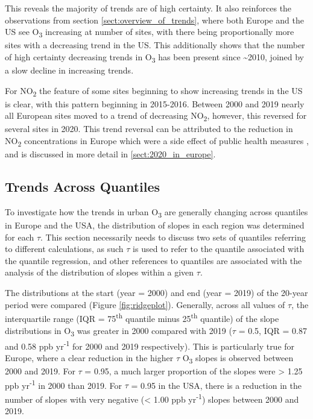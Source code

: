 \documentclass[journal abbreviation, manuscript]{copernicus}
\begin{document}
This reveals the majority of trends are of high certainty. It also reinforces the observations from section \ref{sect:overview_of_trends}, where both Europe and the US see O\textsubscript{3} increasing at number of sites, with there being proportionally more sites with a decreasing trend in the US. This additionally shows that the number of high certainty decreasing trends in O\textsubscript{3} has been present since \textasciitilde{2010}, joined by a slow decline in increasing trends. 

For NO\textsubscript{2} the feature of some sites beginning to show increasing trends in the US is clear, with this pattern beginning in 2015-2016. Between 2000 and 2019 nearly all European sites moved to a trend of decreasing NO\textsubscript{2}, however, this reversed for several sites in 2020. This trend reversal can be attributed to the reduction in NO\textsubscript{2} concentrations in Europe which were a side effect of public health measures \citep{acp-20-15743-2020, acp-21-4169-2021}, and is discussed in more detail in \ref{sect:2020_in_europe}.  


\subsection{Trends Across Quantiles} \label{sect:trends_across_quantiles}

To investigate how the trends in urban O\textsubscript{3} are generally changing across quantiles in Europe and the USA, the distribution of slopes in each region was determined for each $\tau$. This section necessarily needs to discuss two sets of quantiles referring to different calculations, as such $\tau$ is used to refer to the quantile associated with the quantile regression, and other references to quantiles are associated with the analysis of the distribution of slopes within a given $\tau$.

The distributions at the start (year = 2000) and end (year = 2019) of the 20-year period were compared (Figure \ref{fig:ridgeplot}). Generally, across all values of $\tau$, the interquartile range (IQR = 75\textsuperscript{th} quantile minus 25\textsuperscript{th} quantile) of the slope distributions in O\textsubscript{3} was greater in 2000 compared with 2019 ($\tau$ = 0.5, IQR = 0.87 and 0.58 ppb yr\textsuperscript{-1} for 2000 and 2019 respectively). This is particularly true for Europe, where a clear reduction in the higher $\tau$ O\textsubscript{3} slopes is observed between 2000 and 2019. For $\tau$ = 0.95, a much larger proportion of the slopes were > 1.25 ppb yr\textsuperscript{-1} in 2000 than 2019. For $\tau$ = 0.95 in the USA, there is a reduction in the number of slopes with very negative (< 1.00 ppb yr\textsuperscript{-1}) slopes between 2000 and 2019.
\end{document}
